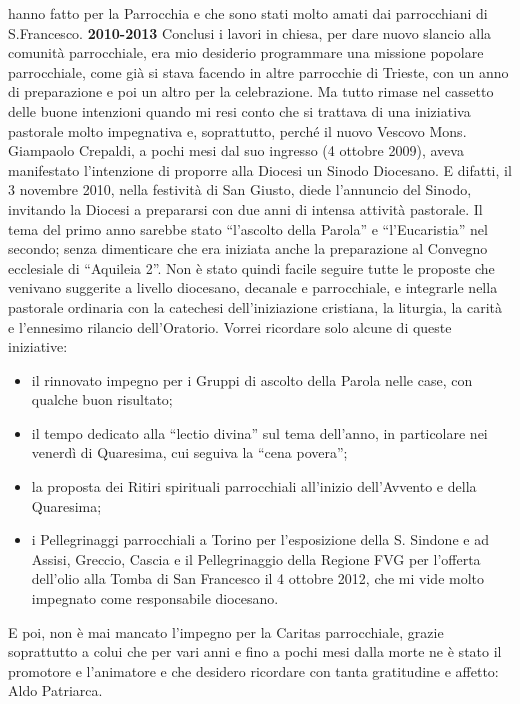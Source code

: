 hanno fatto per la Parrocchia e che sono stati molto amati dai parrocchiani di S.Francesco.
\bigbreak
{}
\noindent \textbf{2010-2013}
\medbreak
\noindent Conclusi i lavori in chiesa, per dare nuovo slancio alla comunità parrocchiale, era mio 
desiderio programmare una missione popolare parrocchiale, come già si stava facendo in altre 
parrocchie di Trieste, con un anno di preparazione e poi un altro per la celebrazione. 
Ma tutto rimase nel cassetto delle buone intenzioni quando mi resi conto che si trattava di una 
iniziativa pastorale molto impegnativa e, soprattutto, perché il nuovo Vescovo Mons. Giampaolo 
Crepaldi, a pochi mesi dal suo ingresso (4 ottobre 2009), aveva manifestato l'intenzione di proporre 
alla Diocesi un Sinodo Diocesano. 
E difatti, il 3 novembre 2010, nella festività di San Giusto, diede l'annuncio del Sinodo, invitando la 
Diocesi a prepararsi con due anni di intensa attività pastorale. 
Il tema del primo anno sarebbe stato “l'ascolto della Parola” e “l'Eucaristia” nel secondo; senza 
dimenticare che era iniziata anche la preparazione al Convegno ecclesiale di “Aquileia 2”.
Non è stato quindi facile seguire tutte le proposte che venivano suggerite a livello diocesano, 
decanale e parrocchiale, e integrarle nella pastorale ordinaria con la catechesi dell'iniziazione 
cristiana, la liturgia, la carità e l'ennesimo rilancio dell'Oratorio. 
Vorrei ricordare solo alcune di queste iniziative:
\begin{itemize}
	\item il rinnovato impegno per i Gruppi di ascolto della Parola nelle case, con qualche buon risultato;
	\item il tempo dedicato alla “lectio divina” sul tema dell'anno, in particolare nei venerdì di Quaresima, 
cui seguiva la “cena povera”;
	\item la proposta dei Ritiri spirituali parrocchiali all'inizio dell'Avvento e della Quaresima;
	\item i Pellegrinaggi parrocchiali a Torino per l'esposizione della S. Sindone e ad Assisi, Greccio, 
Cascia e il Pellegrinaggio della Regione FVG per l'offerta dell'olio alla Tomba di San Francesco il 4 
ottobre 2012, che mi vide molto impegnato come responsabile diocesano.
\end{itemize}
E poi, non è mai mancato l'impegno per la Caritas parrocchiale, grazie soprattutto a colui 
che per vari anni e fino a pochi mesi dalla morte ne è stato il promotore e l'animatore e che desidero 
ricordare con tanta gratitudine e affetto: Aldo Patriarca. 
